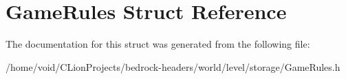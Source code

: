 \hypertarget{struct_game_rules}{}\section{Game\+Rules Struct Reference}
\label{struct_game_rules}


The documentation for this struct was generated from the following file\+:\begin{DoxyCompactItemize}
\item 
/home/void/\+C\+Lion\+Projects/bedrock-\/headers/world/level/storage/Game\+Rules.\+h\end{DoxyCompactItemize}
